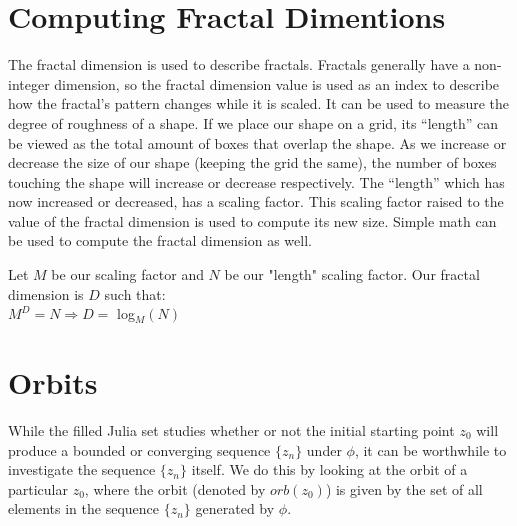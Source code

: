 \documentclass[12pt]{article}
\begin{document}
\section{Computing Fractal Dimentions}
The fractal dimension is used to describe fractals. Fractals generally have a non-integer dimension, so the fractal dimension value is used as an index to describe how the fractal’s pattern changes while it is scaled. It can be used to measure the degree of roughness of a shape. If we place our shape on a grid, its “length” can be viewed as the total amount of boxes that overlap the shape. As we increase or decrease the size of our shape (keeping the grid the same), the number of boxes touching the shape will increase or decrease respectively. The “length” which has now increased or decreased, has a scaling factor. This scaling factor raised to the value of the fractal dimension is used to compute its new size. Simple math can be used to compute the fractal dimension as well.

Let $M$ be our scaling factor and $N$ be our "length" scaling factor. Our fractal dimension is $D$ such that:  \\
$M^{D} = N \Rightarrow D =$ log$_{M}(N)$


\section{Orbits}

While the filled Julia set studies whether or not the initial starting point $z_0$ will produce a bounded or converging sequence $\{z_n\}$ under $\phi$, it can be worthwhile to investigate the sequence $\{z_n\}$ itself. We do this by looking at the orbit of a particular $z_0$, where the orbit (denoted by $orb(z_0)$) is given by the set of all elements in the sequence $\{z_n\}$ generated by $\phi$. 
	
\end{document}
